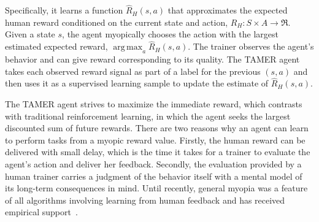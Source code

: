 \documentclass[10pt,journal,compsoc]{IEEEtran}
\DeclareMathOperator*{\argmax}{arg\,max}
\begin{document}
Specifically, it learns a function $\hat{R}_{H}(s, a)$ that approximates the expected human reward conditioned on the current state and action, $R_{H}: S \times A \rightarrow \Re$. Given a state $s$, the agent myopically chooses the action with the largest estimated expected reward, $\argmax_{a}\hat{R}_{H}(s, a)$. The trainer observes the agent's behavior and can give reward corresponding to its quality. The TAMER agent takes each observed reward signal as part of a label for the previous $(s,a)$ and then uses it as a supervised learning sample to update the estimate of $\hat{R}_{H}(s, a)$. %



The TAMER agent strives to maximize the immediate reward, %
which contrasts with traditional reinforcement learning, in which the agent seeks the largest discounted sum of future rewards. There are two reasons why an agent can learn to perform tasks from a myopic reward value. Firstly, the human reward can be delivered with small delay, which is the time it takes for a trainer to evaluate the agent's action and deliver her feedback. Secondly, the evaluation provided by a human trainer carries a judgment of the behavior itself with a mental model of its long-term consequences in mind. 
Until recently, general myopia was a feature of all algorithms involving learning from human feedback and has received empirical support~\cite{knox2015framing}.
\end{document}
